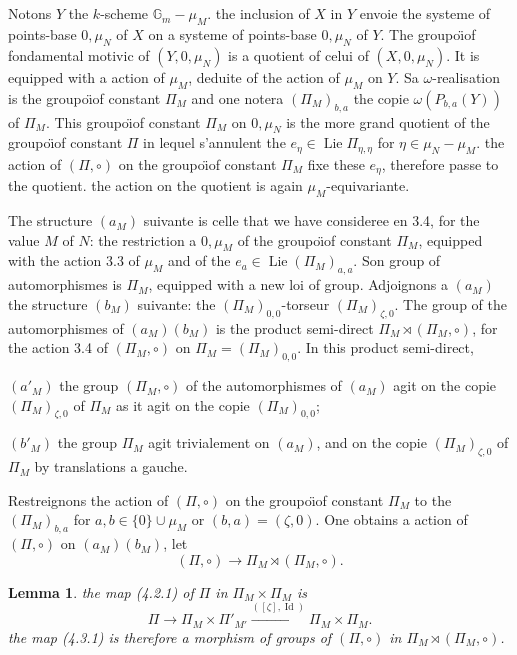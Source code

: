 \documentclass[11pt,a4paper]{article}
\theoremstyle{plain}
\newtheorem{lemma}[theorem]{Lemma}
\theoremstyle{definition}
\DeclareMathOperator{\Lie}{Lie}
\DeclareMathOperator{\Id}{Id}
\newcommand{\Gm}{\mathbb{G}_m}
\begin{document}
\subsection{}
Notons $Y$ the $k$-scheme $\Gm - \mu_M$. the inclusion of $X$ in $Y$ envoie the systeme of points-base $0, \mu_N$ of $X$ on a systeme of points-base $0, \mu_N$ of $Y$. The groupo\"{\i}of fondamental motivic of $(Y, 0, \mu_N)$ is a quotient of celui of $(X, 0, \mu_N)$. It is equipped with a action of $\mu_M$, deduite of the action of $\mu_M$ on $Y$. Sa $\omega$-realisation is the groupo\"{\i}of constant $\Pi_M$ and one notera $(\Pi_M)_{b,a}$ the copie $\omega(P_{b,a}(Y))$ of $\Pi_M$. This groupo\"{\i}of constant $\Pi_M$ on $0, \mu_N$ is the more grand quotient of the groupo\"{\i}of constant $\Pi$ in lequel s'annulent the $e_\eta \in \Lie \Pi_{\eta,\eta}$ for $\eta \in \mu_N - \mu_M$. the action of $(\Pi, \circ)$ on the groupo\"{\i}of constant $\Pi_M$ fixe these $e_\eta$, therefore passe to the quotient. the action on the quotient is again $\mu_M$-equivariante.

The structure $(a_M)$ suivante is celle that we have consideree en 3.4, for the value $M$ of $N$: the restriction a $0, \mu_M$ of the groupo\"{\i}of constant $\Pi_M$, equipped with the action 3.3 of $\mu_M$ and of the $e_a \in \Lie(\Pi_M)_{a,a}$. Son group of automorphismes is $\Pi_M$, equipped with a new loi of group.
Adjoignons a $(a_M)$ the structure $(b_M)$ suivante: the $(\Pi_M)_{0,0}$-torseur $(\Pi_M)_{\zeta,0}$. The group of the automorphismes of $(a_M)(b_M)$ is the product semi-direct $\Pi_M \rtimes (\Pi_M, \circ)$, for the action 3.4 of $(\Pi_M, \circ)$ on $\Pi_M = (\Pi_M)_{0,0}$. In this product semi-direct,

$(a'_{M})$ the group $(\Pi_M, \circ)$ of the automorphismes of $(a_M)$ agit on the copie $(\Pi_M)_{\zeta,0}$ of $\Pi_M$ as it agit on the copie $(\Pi_M)_{0,0}$;

$(b'_{M})$ the group $\Pi_M$ agit trivialement on $(a_M)$, and on the copie $(\Pi_M)_{\zeta,0}$ of $\Pi_M$ by translations a gauche.

Restreignons the action of $(\Pi, \circ)$ on the groupo\"{\i}of constant $\Pi_M$ to the $(\Pi_M)_{b,a}$ for $a,b \in \{0\} \cup \mu_M$ or $(b,a) = (\zeta, 0)$. One obtains a action of $(\Pi, \circ)$ on $(a_M)(b_M)$, let
\begin{equation}\label{eq:4.2.1}
(\Pi, \circ) \to \Pi_M \rtimes (\Pi_M, \circ).
\end{equation}

\begin{lemma}\label{lem:4.3}
the map (4.2.1) of $\Pi$ in $\Pi_M \times \Pi_{M}$ is
\begin{equation}\label{eq:4.3.1}
\Pi \to \Pi_M \times \Pi'_{M'} \xrightarrow{([\zeta], \Id)} \Pi_M \times \Pi_M.
\end{equation}
the map (4.3.1) is therefore a morphism of groups of $(\Pi, \circ)$ in $\Pi_M \rtimes (\Pi_M, \circ)$.
\end{lemma}
\end{document}
